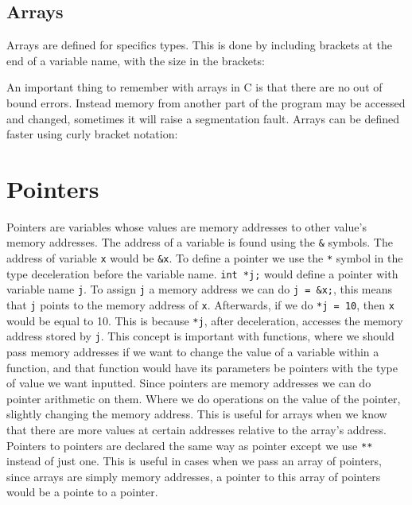 \documentclass{report}
\begin{document}
   \subsection{Arrays}
   Arrays are defined for specifics types. This is done by including brackets at the end of a variable name, with the size in the brackets:


   An important thing to remember with arrays in C is that there are no out of bound errors. Instead memory from another part of the program may be accessed and changed, sometimes it will raise a segmentation fault. Arrays can be defined faster using curly bracket notation:



   \section{Pointers}

   Pointers are variables whose values are memory addresses to other value's memory addresses. The address of a variable is found using the \texttt{\&} symbols. The address of variable \texttt{x} would be \texttt{\&x}. To define a pointer we use the \texttt{*} symbol in the type deceleration before the variable name. \texttt{int *j;} would define a pointer with variable name \texttt{j}. To assign \texttt{j} a memory address we can do \texttt{j = \&x;}, this means that \texttt{j} points to the memory address of \texttt{x}. Afterwards, if we do \texttt{*j = 10}, then \texttt{x} would be equal to 10. This is because \texttt{*j}, after deceleration, accesses the memory address stored by \texttt{j}. This concept is important with functions, where we should pass memory addresses if we want to change the value of a variable within a function, and that function would have its parameters be pointers with the type of value we want inputted. Since pointers are memory addresses we can do pointer arithmetic on them. Where we do operations on the value of the pointer, slightly changing the memory address. This is useful for arrays when we know that there are more values at certain addresses relative to the array's address. Pointers to pointers are declared the same way as pointer except we use \texttt{**} instead of just one. This is useful in cases when we pass an array of pointers, since arrays are simply memory addresses, a pointer to this array of pointers would be a pointe to a pointer.

    
\end{document}
